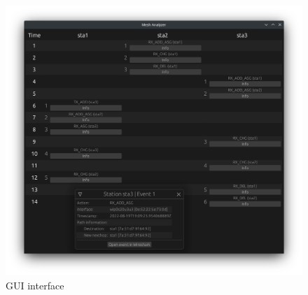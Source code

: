 \begin{figure}[htb]
   \centering
   \includegraphics[scale=.575]{gui}
   \caption{\ac{GUI} interface}\label{fig:hardtest}
\end{figure}
